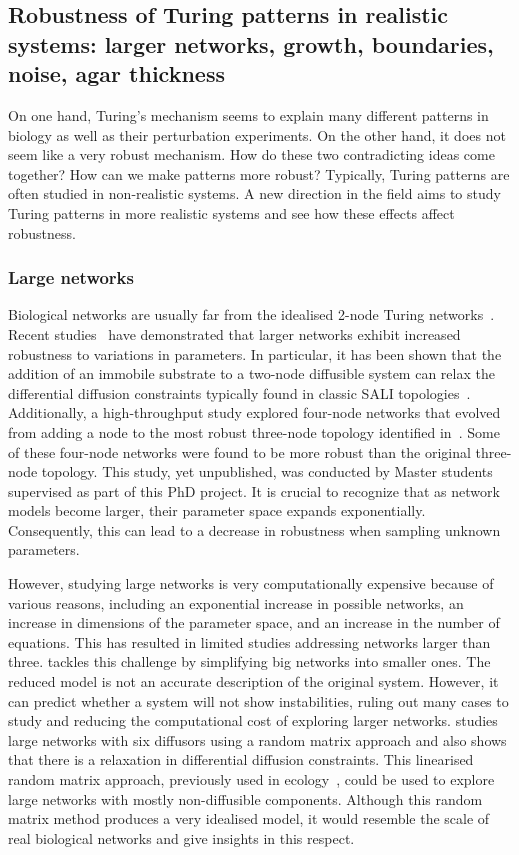 \subsection{Robustness of Turing patterns in realistic systems: larger networks, growth, boundaries, noise, agar thickness}
On one hand, Turing's mechanism seems to explain many different patterns in biology as well as their perturbation experiments.
On the other hand, it does not seem like a very robust mechanism.
How do these two contradicting ideas come together?
How can we make patterns more robust?
Typically, Turing patterns are often studied in non-realistic systems.
A new direction in the field aims to study Turing patterns in more realistic systems and see how these effects affect robustness.


\subsubsection{Large networks}
Biological networks are usually far from the idealised 2-node Turing networks~\parencite{jenssen2001literature}.
Recent studies~\parencite{Zheng2016, Scholes2019, Marcon} have demonstrated that larger networks exhibit increased robustness to variations in parameters.
In particular, it has been shown that the addition of an immobile substrate to a two-node diffusible system can relax the differential diffusion constraints typically found in classic SALI topologies~\parencite{korvasova2015}.
Additionally, a high-throughput study explored four-node networks that evolved from adding a node to the most robust three-node topology identified in~\cite{Scholes2019}.
Some of these four-node networks were found to be more robust than the original three-node topology.
This study, yet unpublished, was conducted by Master students supervised as part of this PhD project.
It is crucial to recognize that as network models become larger, their parameter space expands exponentially.
Consequently, this can lead to a decrease in robustness when sampling unknown parameters.

However, studying large networks is very computationally expensive because of various reasons, including an exponential increase in possible networks, an increase in dimensions of the parameter space, and an increase in the number of equations.
This has resulted in limited studies addressing networks larger than three.
\cite{Smith2018a} tackles this challenge by simplifying big networks into smaller ones.
The reduced model is not an accurate description of the original system.
However, it can predict whether a system will not show instabilities, ruling out many cases to study and reducing the computational cost of exploring larger networks.
\cite{Haas2021} studies large networks with six diffusors using a random matrix approach and also shows that there is a relaxation in differential diffusion constraints.
This linearised random matrix approach, previously used in ecology~\parencite{May1972}, could be used to explore large networks with mostly non-diffusible components.
Although this random matrix method produces a very idealised model, it would resemble the scale of real biological networks and give insights in this respect.

